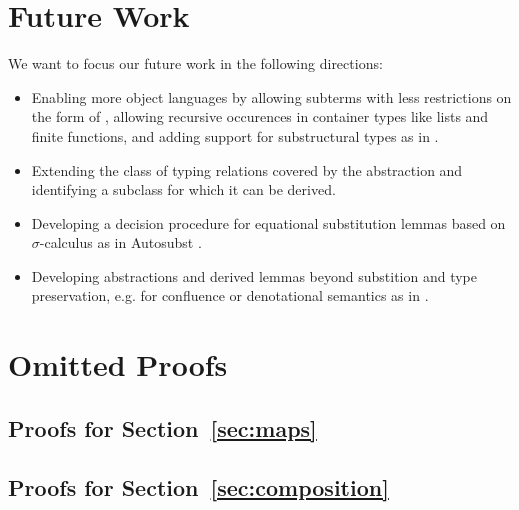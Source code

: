 \documentclass[a4paper, UKenglish, cleveref, autoref, thm-restate]{lipics-v2021}
\newenvironment{LibCode*}{%
  \begin{tcolorbox}[%
    colframe=white,%
    boxrule=0.0pt,%
    top=2.5pt,%
    left=2.5pt,%
    bottom=2.5pt,%
    right=2.5pt,%
    boxsep=0pt%
  ]\vspace{-0.2\baselineskip}%
}{%
  \vspace{-1\baselineskip}%
  \end{tcolorbox}%
}
\newcommand*\LibCode[1]{\begin{LibCode*}{#1}\end{LibCode*}}
\newcommand*\AppCode[1]{{#1}}
\newcommand*\ACode[1]{\AgdaFontStyle{\textcolor{mygray}{#1}}}
\newcommand*\ACon[1]{\AgdaInductiveConstructor{#1}}
\begin{document}
  \section{Future Work}
  \label{sec:future}
  We want to focus our future work in the following directions:
  \begin{itemize}
  \item
    Enabling more object languages by allowing subterms with less
    restrictions on the form of \ACode{S}, allowing recursive
    occurences in container types like lists and finite functions, and
    adding support for substructural types as in
    \cite{DBLP:journals/corr/abs-2005-02247}.
  \item
    Extending the class of typing relations covered by
    the \ACode{\ACon{TypingTraversal}} abstraction and identifying
    a subclass for which it can be derived.
  \item
    Developing a decision procedure for equational
    substitution lemmas based on $\sigma$-calculus as in Autosubst
    \cite{DBLP:conf/itp/SchaferTS15, DBLP:conf/cpp/StarkSK19}.
  \item
    Developing abstractions and derived lemmas beyond substition and
    type preservation, e.g. for confluence or denotational semantics
    as in \cite{DBLP:journals/pacmpl/AllaisA0MM18}.
  \end{itemize}

  

  \clearpage
  \appendix
  \onecolumn

  \section{Omitted Proofs}
  \label{sec:proofs}

  \subsection{Proofs for Section~\ref{sec:maps}}
  \LibCode\KIdLift
  \LibCode\KIdLiftProof


  \subsection{Proofs for Section~\ref{sec:composition}}
  \LibCode\KComposeKitAp
  \LibCode\KComposeKitApProof
\end{document}
